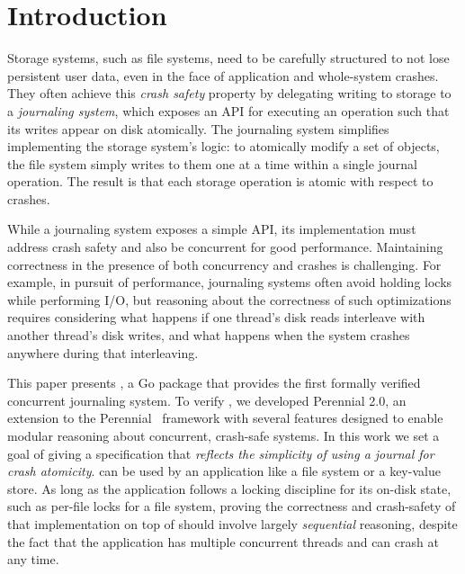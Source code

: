 \section{Introduction}


Storage systems, such as file systems, need to be carefully structured
to not lose persistent user data, even in the face of application and
whole-system crashes. They often achieve this \emph{crash safety}
property by delegating writing to storage to a \emph{journaling
system}, which exposes an API for executing an operation such that its
writes appear on disk atomically. The journaling system simplifies
implementing the storage system's logic: to atomically modify a set of
objects, the file system simply writes to them one at a time within a single
journal operation.  The result is that each storage operation is atomic with
respect to crashes.

While a journaling system exposes a simple API, its implementation must address
crash safety and also be concurrent for good performance.
Maintaining correctness in the presence of both concurrency and crashes is
challenging.  For example, in pursuit of performance, journaling systems
often avoid holding locks while performing I/O, but reasoning
about the correctness of such optimizations requires considering what
happens if one thread's disk reads interleave with another thread's
disk writes, and what happens when the system crashes anywhere
during that interleaving.

This paper presents \txn, a Go package that provides the first formally verified concurrent journaling
system. To verify \txn, we developed Perennial 2.0, an extension to the Perennial~\citep{chajed:perennial} framework
with several features designed to enable modular reasoning about concurrent, crash-safe systems.
In this work we set a goal of giving
\txn a specification that \emph{reflects the simplicity of using a journal for
crash atomicity}.
\txn can be used by an application like a file system or a key-value
store. As long as the application follows a locking discipline
for its on-disk state, such as per-file locks for a file system, proving the correctness
and crash-safety of that implementation on top of \txn should involve
largely \emph{sequential} reasoning, despite the fact that the application
has multiple concurrent threads and can crash at any time.

